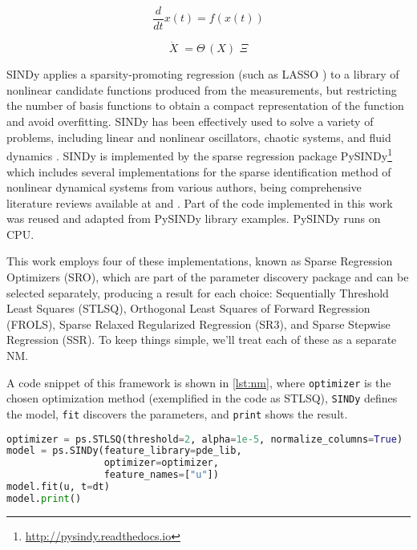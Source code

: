 \documentclass[conference]{IEEEtran}
\begin{document}
\begin{equation}
\frac{d}{dt}x(t) = f(x(t))
\label{eq:sn1}\end{equation}

\begin{equation}
\dot{X} \; = \Theta \,(X)\,\,\Xi
\label{eq:sn2}
\end{equation}

SINDy applies a sparsity-promoting regression (such as LASSO \cite{Tibshirani2011}) to a library of nonlinear candidate functions produced from the measurements, but restricting the number of basis functions to obtain a compact representation of the function and avoid overfitting.   
SINDy has been effectively used to solve a variety of problems, including linear and nonlinear oscillators, chaotic systems, and fluid dynamics \cite{Brunton2016}. SINDy is implemented by the sparse regression package PySINDy\footnote{\url{http://pysindy.readthedocs.io}} which includes several implementations for the sparse identification method of nonlinear dynamical systems from various authors, being  comprehensive literature reviews available at \cite{DeSilva2020} and \cite{Kaptanoglu2022}. Part of the code implemented in this work was reused and adapted from PySINDy library examples. PySINDy runs on CPU.


This work employs four of these implementations, known as Sparse Regression Optimizers (SRO), which are part of the parameter discovery package and can be selected separately, producing a result for each choice: Sequentially Threshold Least Squares (STLSQ), Orthogonal Least Squares of Forward Regression (FROLS), Sparse Relaxed Regularized Regression (SR3), and Sparse Stepwise Regression (SSR). To keep things simple, we'll treat each of these as a separate NM.

A code snippet of this framework is shown in \autoref{lst:nm}, where \texttt{optimizer} is the chosen optimization method (exemplified in the code as STLSQ), \texttt{SINDy} defines the model, \texttt{fit} discovers the parameters, and \texttt{print} shows the result. 

\begin{minipage}[htb]{.94\columnwidth}
\begin{lstlisting}[language=Python, label=lst:nm, caption={Python code snippet that implements the NM for data-driven PDE parameter discovery. The STLSQ is one of the optimizers in the PySINDy framework.}]
optimizer = ps.STLSQ(threshold=2, alpha=1e-5, normalize_columns=True)
model = ps.SINDy(feature_library=pde_lib,
                 optimizer=optimizer,
                 feature_names=["u"])
model.fit(u, t=dt)
model.print()
\end{lstlisting}
\end{minipage}%
\end{document}
